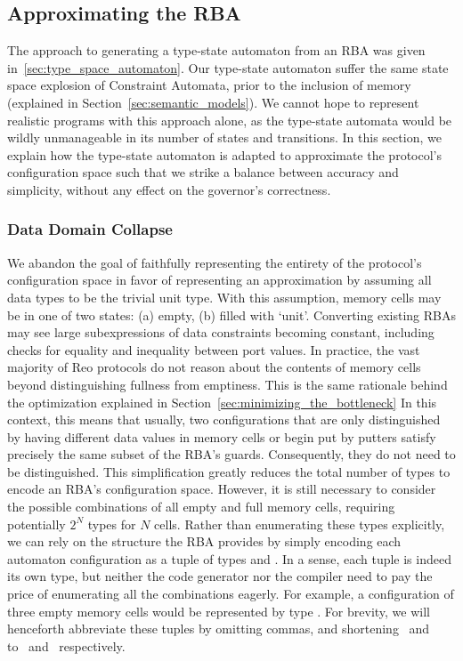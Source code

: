 \subsection{Approximating the RBA}
The approach to generating a type-state automaton from an RBA was given in~\ref{sec:type_space_automaton}. Our type-state automaton suffer the same state space explosion of Constraint Automata, prior to the inclusion of memory (explained in Section~\ref{sec:semantic_models}). We cannot hope to represent realistic programs with this approach alone, as the type-state automata would be wildly unmanageable in its number of states and transitions. In this section, we explain how the type-state automaton is adapted to approximate the protocol's configuration space such that we strike a balance between accuracy and simplicity, without any effect on the governor's correctness.

\subsubsection{Data Domain Collapse}
\label{sec:approximating_rba}
We abandon the goal of faithfully representing the entirety of the protocol's configuration space in favor of representing an approximation by assuming all data types to be the trivial unit type. With this assumption, memory cells may be in one of two states: (a) empty, (b) filled with `unit'. Converting existing RBAs may see large subexpressions of data constraints becoming constant, including checks for equality and inequality between port values. In practice, the vast majority of Reo protocols do not reason about the contents of memory cells beyond distinguishing fullness from emptiness. This is the same rationale behind the optimization explained in Section~\ref{sec:minimizing_the_bottleneck} In this context, this means that usually, two configurations that are only distinguished by having different data values in memory cells or begin put by putters satisfy precisely the same subset of the RBA's guards. Consequently, they do not need to be distinguished. This simplification greatly reduces the total number of types to encode an RBA's configuration space. However, it is still necessary to consider the possible combinations of all empty and full memory cells, requiring potentially $2^N$ types for $N$ cells. Rather than enumerating these types explicitly, we can rely on the structure the RBA provides by simply encoding each automaton configuration as a tuple of types  and . In a sense, each tuple is indeed its own type, but neither the code generator nor the compiler need to pay the price of enumerating all the combinations eagerly. For example, a configuration of three empty memory cells would be represented by type . For brevity, we will henceforth abbreviate these tuples by omitting commas, and shortening~ and~ to~ and~ respectively.



